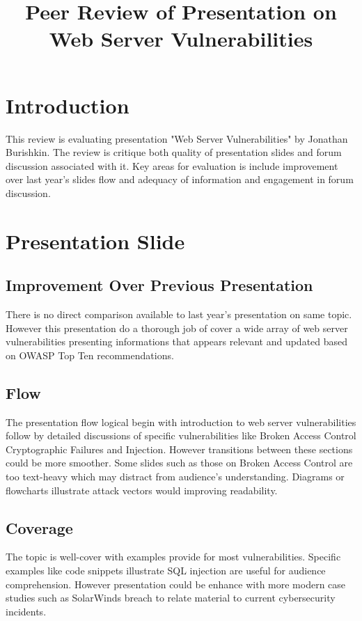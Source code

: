 \documentclass{article}
\title{Peer Review of Presentation on Web Server Vulnerabilities}
\date{}
\begin{document}
\maketitle

\section{Introduction}
This review is evaluating presentation "Web Server Vulnerabilities" by Jonathan Burishkin. The review is critique both quality of presentation slides and forum discussion associated with it. Key areas for evaluation is include improvement over last year’s slides flow and adequacy of information and engagement in forum discussion.

\section{ Presentation Slide }
\subsection{Improvement Over Previous Presentation}
There is no direct comparison available to last year's presentation on same topic. However this presentation do a thorough job of cover a wide array of web server vulnerabilities presenting informations that appears relevant and updated based on OWASP Top Ten recommendations.

\subsection{Flow }
The presentation flow logical begin with introduction to web server vulnerabilities follow by detailed discussions of specific vulnerabilities like Broken Access Control Cryptographic Failures and Injection. However transitions between these sections could be more smoother. Some slides such as those on Broken Access Control are too text-heavy which may distract from audience's understanding. Diagrams or flowcharts illustrate attack vectors would improving readability.

\subsection{Coverage}
The topic is well-cover with examples provide for most vulnerabilities. Specific examples like code snippets illustrate SQL injection are useful for audience comprehension. However presentation could be enhance with more modern case studies such as SolarWinds breach to relate material to current cybersecurity incidents.
\end{document}
